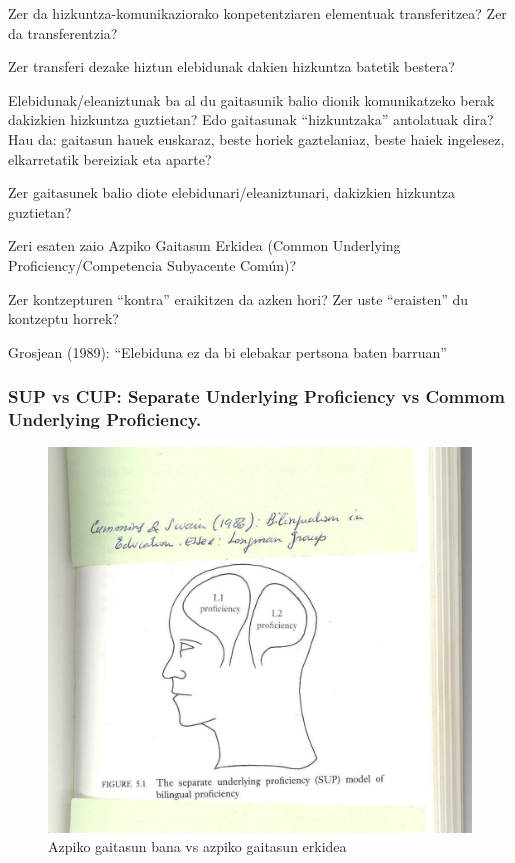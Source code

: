 \documentclass[
]{book}
\begin{document}
Zer da hizkuntza-komunikaziorako konpetentziaren elementuak transferitzea? Zer da transferentzia?

Zer transferi dezake hiztun elebidunak dakien hizkuntza batetik bestera?

Elebidunak/eleaniztunak ba al du gaitasunik balio dionik komunikatzeko berak dakizkien hizkuntza guztietan? Edo gaitasunak ``hizkuntzaka'' antolatuak dira? Hau da: gaitasun hauek euskaraz, beste horiek gaztelaniaz, beste haiek ingelesez, elkarretatik bereiziak eta aparte?

Zer gaitasunek balio diote elebidunari/eleaniztunari, dakizkien hizkuntza guztietan?

Zeri esaten zaio Azpiko Gaitasun Erkidea (Common Underlying Proficiency/Competencia Subyacente Común)?

Zer kontzepturen ``kontra'' eraikitzen da azken hori? Zer uste ``eraisten'' du kontzeptu horrek?

Grosjean (1989): ``Elebiduna ez da bi elebakar pertsona baten barruan''

\hypertarget{sup-vs-cup-separate-underlying-proficiency-vs-commom-underlying-proficiency.}{%
\subsubsection{SUP vs CUP: Separate Underlying Proficiency vs Commom Underlying Proficiency.}\label{sup-vs-cup-separate-underlying-proficiency-vs-commom-underlying-proficiency.}}

\begin{figure}
\centering
\includegraphics{Pictures/10000000000004AD000004404BFD4B4D295F27D0.jpg}
\caption{Azpiko gaitasun bana vs azpiko gaitasun erkidea}
\end{figure}
\end{document}
